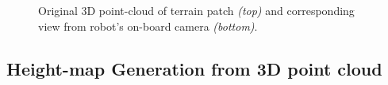 				\begin{figure}[h!]
					\centering
					\caption{Original 3D point-cloud of terrain patch \emph{(top)} and corresponding view from robot's on-board camera \emph{(bottom)}.}
					\label{fig::pointcloud_terrain_patch}
				\end{figure}


		\subsection{Height-map Generation from 3D point cloud}
			
